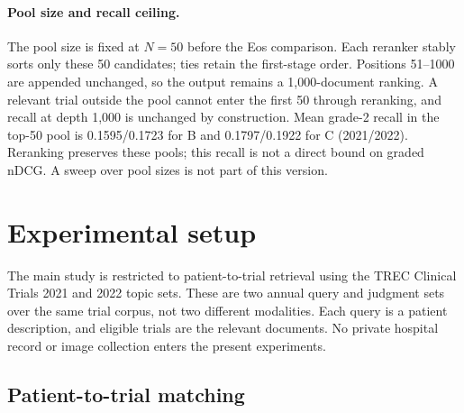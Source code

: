 \documentclass{article}
\begin{document}
\paragraph{Pool size and recall ceiling.} The pool size is fixed at $N=50$ before the Eos comparison. Each reranker stably sorts only these 50 candidates; ties retain the first-stage order. Positions 51--1000 are appended unchanged, so the output remains a 1{,}000-document ranking. A relevant trial outside the pool cannot enter the first 50 through reranking, and recall at depth 1{,}000 is unchanged by construction. Mean grade-2 recall in the top-50 pool is 0.1595/0.1723 for B and 0.1797/0.1922 for C (2021/2022). Reranking preserves these pools; this recall is not a direct bound on graded nDCG. A sweep over pool sizes is not part of this version.

\section{Experimental setup}
\label{sec:setup}

The main study is restricted to patient-to-trial retrieval using the TREC Clinical Trials 2021 and 2022 topic sets. These are two annual query and judgment sets over the same trial corpus, not two different modalities. Each query is a patient description, and eligible trials are the relevant documents. No private hospital record or image collection enters the present experiments.

\subsection{Patient-to-trial matching}
\end{document}
